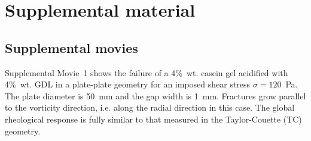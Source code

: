 \documentclass[twocolumn,superscriptaddress,showpacs,preprintnumbers,amsmath,amssymb,prl]{revtex4}
\begin{document}
\begin{thebibliography}{}













\end{thebibliography}

\clearpage
\newpage
\setcounter{figure}{0}

\section*{\large Supplemental material}

\subsection*{Supplemental movies}

Supplemental Movie~1 shows the failure of a 4\%~wt. casein gel acidified with 4\%~wt. GDL in a plate-plate geometry for an imposed shear stress $\sigma=120$~Pa. The plate diameter is 50~mm and the gap width is 1~mm. Fractures grow parallel to the vorticity direction, i.e. along the radial direction in this case. The global rheological response is fully similar to that measured in the Taylor-Couette (TC) geometry.
\end{document}
